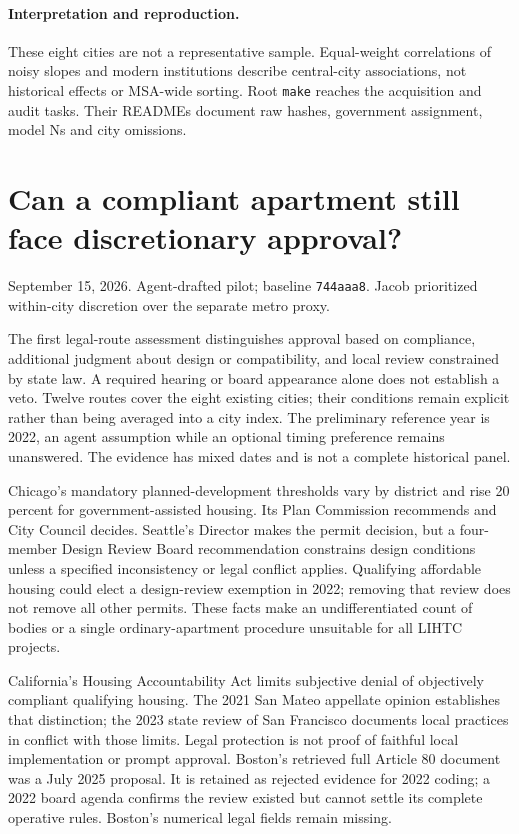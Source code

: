 \documentclass[11pt]{article}
\begin{document}
\paragraph{Interpretation and reproduction.} These eight cities are not a
representative sample. Equal-weight correlations of noisy slopes and modern
institutions describe central-city associations, not historical effects or
MSA-wide sorting. Root \texttt{make} reaches the acquisition and audit tasks.
Their READMEs document raw hashes, government assignment, model Ns and city omissions.

\clearpage
\section*{Can a compliant apartment still face discretionary approval?}
\noindent September 15, 2026. Agent-drafted pilot; baseline \texttt{744aaa8}.
Jacob prioritized within-city discretion over the separate metro proxy.

The first legal-route assessment distinguishes approval based on compliance,
additional judgment about design or compatibility, and local review constrained
by state law. A required hearing or board appearance alone does not establish a
veto. Twelve routes cover the eight existing cities; their conditions remain
explicit rather than being averaged into a city index. The preliminary reference
year is 2022, an agent assumption while an optional timing preference remains
unanswered. The evidence has mixed dates and is not a complete historical panel.



Chicago's mandatory planned-development thresholds vary by district and rise
20 percent for government-assisted housing. Its Plan Commission recommends and
City Council decides. Seattle's Director makes the permit decision, but a
four-member Design Review Board recommendation constrains design conditions
unless a specified inconsistency or legal conflict applies. Qualifying affordable
housing could elect a design-review exemption in 2022; removing that review does
not remove all other permits. These facts make an undifferentiated count of
bodies or a single ordinary-apartment procedure unsuitable for all LIHTC projects.

California's Housing Accountability Act limits subjective denial of objectively
compliant qualifying housing. The 2021 San Mateo appellate opinion establishes
that distinction; the 2023 state review of San Francisco documents local practices
in conflict with those limits. Legal protection is not proof of faithful local
implementation or prompt approval. Boston's retrieved full Article 80 document
was a July 2025 proposal. It is retained as rejected evidence for 2022 coding;
a 2022 board agenda confirms the review existed but cannot settle its complete
operative rules. Boston's numerical legal fields remain missing.
\end{document}
